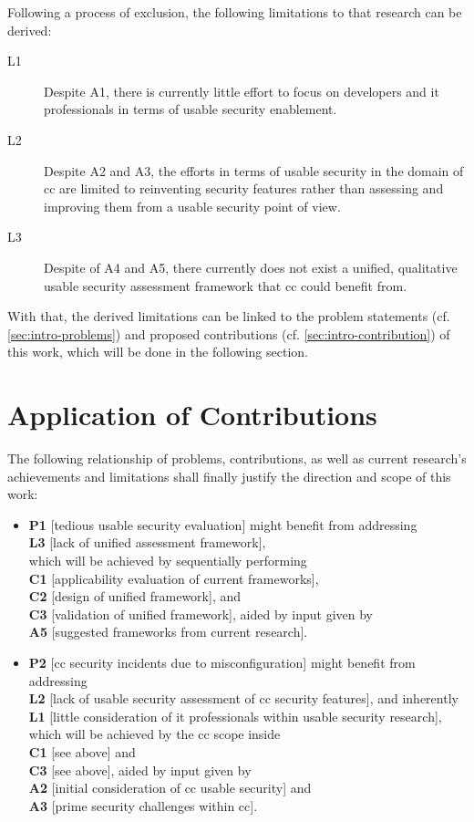 Following a process of exclusion, the following limitations to that research can be derived:

\begin{description}
	\item[L1] Despite A1, there is currently little effort to focus on developers and \ac{it} professionals in terms of usable security enablement.
	\item[L2] Despite A2 and A3, the efforts in terms of usable security in the domain of \ac{cc} are limited to reinventing security features rather than assessing and improving them from a usable security point of view.
	\item[L3] Despite of A4 and A5, there currently does not exist a unified, qualitative usable security assessment framework that \ac{cc} could benefit from.
\end{description}

With that, the derived limitations can be linked to the problem statements (cf. \autoref{sec:intro-problems}) and proposed contributions (cf. \autoref{sec:intro-contribution}) of this work, which will be done in the following section.

\section{Application of Contributions}
The following relationship of problems, contributions, as well as current research's achievements and limitations shall finally justify the direction and scope of this work:

\begin{itemize}
	\item \textbf{P1} [tedious usable security evaluation] might benefit from addressing\\ \textbf{L3} [lack of unified assessment framework],\\ which will be achieved by sequentially performing\\ \textbf{C1} [applicability evaluation of current frameworks],\\ \textbf{C2} [design of unified framework], and\\\textbf{C3} [validation of unified framework], aided by input given by\\ \textbf{A5} [suggested frameworks from current research].
	\item \textbf{P2} [\ac{cc} security incidents due to misconfiguration] might benefit from addressing\\ \textbf{L2} [lack of usable security assessment of \ac{cc} security features], and inherently\\ \textbf{L1} [little consideration of \ac{it} professionals within usable security research],\\ which will be achieved by the \ac{cc} scope inside\\ \textbf{C1} [see above] and\\ \textbf{C3} [see above], aided by input given by \\\textbf{A2} [initial consideration of \ac{cc} usable security]  and \\\textbf{A3} [prime security challenges within \ac{cc}]. 
\end{itemize}

